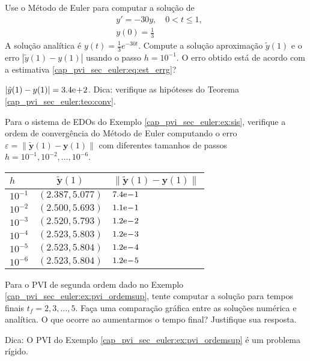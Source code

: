 \begin{exer}
  Use o Método de Euler para computar a solução de
  \begin{subequations}
    \begin{align}
      &y' = -30y,\quad 0 < t\leq 1,\\
      &y(0) = \frac{1}{3}
    \end{align}
  \end{subequations}
  A solução analítica é $y(t) = \frac{1}{3}e^{-30t}$. Compute a solução aproximação $\tilde{y}(1)$ e o erro $|\tilde{y}(1) - y(1)|$ usando o passo $h=10^{-1}$. O erro obtido está de acordo com a estimativa \eqref{cap_pvi_sec_euler:eq:est_errg}?
\end{exer}
\begin{resp}
  $|\tilde{y}(1) - y(1)| = 3.4\mathrm{e}\!+\!2$. Dica: verifique as hipóteses do Teorema \ref{cap_pvi_sec_euler:teo:conv}.
\end{resp}

\begin{exer}
  Para o sistema de EDOs do Exemplo \ref{cap_pvi_sec_euler:ex:sis}, verifique a ordem de convergência do Método de Euler computando o erro $\varepsilon = \|\tilde{\pmb{y}}(1) - \pmb{y}(1)\|$ com diferentes tamanhos de passos $h = 10^{-1}, 10^{-2}, \dotsc, 10^{-6}$. 
\end{exer}
\begin{resp}
  \begin{tabular}{l|c|l}
    $h$ & $\tilde{\pmb{y}}(1)$ & $\|\tilde{\pmb{y}}(1) - \pmb{y}(1)\|$ \\\hline
    $10^{-1}$ & $(2.387, 5.077)$ & $7.4\mathrm{e}\!-\!1$ \\
    $10^{-2}$ & $(2.500, 5.693)$ & $1.1\mathrm{e}\!-\!1$ \\
    $10^{-3}$ & $(2.520, 5.793)$ & $1.2\mathrm{e}\!-\!2$ \\
    $10^{-4}$ & $(2.523, 5.803)$ & $1.2\mathrm{e}\!-\!3$ \\
    $10^{-5}$ & $(2.523, 5.804)$ & $1.2\mathrm{e}\!-\!4$ \\
    $10^{-6}$ & $(2.523, 5.804)$ & $1.2\mathrm{e}\!-\!5$ \\\hline
  \end{tabular}
\end{resp}

\begin{exer}
  Para o PVI de segunda ordem dado no Exemplo \ref{cap_pvi_sec_euler:ex:pvi_ordemsup}, tente computar a solução para tempos finais $t_f = 2, 3, \dotsc, 5$. Faça uma comparação gráfica entre as soluções numérica e analítica. O que ocorre ao aumentarmos o tempo final? Justifique sua resposta.
\end{exer}
\begin{resp}
  Dica: O PVI do Exemplo \ref{cap_pvi_sec_euler:ex:pvi_ordemsup} é um problema rígido.
\end{resp}


